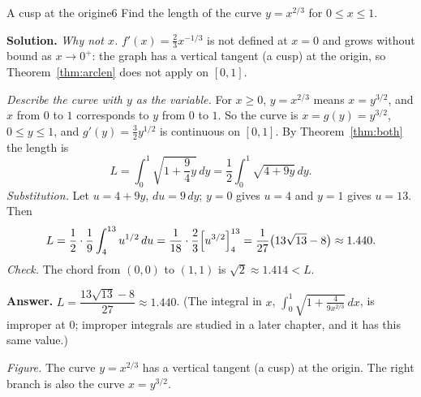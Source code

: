 \documentclass[11pt]{article}
\begin{document}
\begin{exmp}{A cusp at the origin}{e6}
Find the length of the curve $y=x^{2/3}$ for $0\le x\le1$.

\textbf{Solution.} \emph{Why not $x$.} $f'(x)=\frac23x^{-1/3}$ is not defined at $x=0$ and grows without bound as $x\to0^+$: the graph has a vertical tangent (a cusp) at the origin, so Theorem~\ref{thm:arclen} does not apply on $[0,1]$.

\emph{Describe the curve with $y$ as the variable.} For $x\ge0$, $y=x^{2/3}$ means $x=y^{3/2}$, and $x$ from $0$ to $1$ corresponds to $y$ from $0$ to $1$. So the curve is $x=g(y)=y^{3/2}$, $0\le y\le1$, and $g'(y)=\frac32y^{1/2}$ is continuous on $[0,1]$. By Theorem~\ref{thm:both} the length is
\[
L=\int_0^1\sqrt{1+\frac94y}\,dy=\frac12\int_0^1\sqrt{4+9y}\,dy .
\]
\emph{Substitution.} Let $u=4+9y$, $du=9\,dy$; $y=0$ gives $u=4$ and $y=1$ gives $u=13$. Then
\[
L=\frac12\cdot\frac19\int_4^{13}u^{1/2}\,du=\frac1{18}\cdot\frac23\Bigl[u^{3/2}\Bigr]_4^{13}=\frac1{27}\bigl(13\sqrt{13}-8\bigr)\approx1.440 .
\]
\emph{Check.} The chord from $(0,0)$ to $(1,1)$ is $\sqrt2\approx1.414<L$.

\textbf{Answer.} $L=\dfrac{13\sqrt{13}-8}{27}\approx1.440$. (The integral in $x$, $\int_0^1\sqrt{1+\frac4{9x^{2/3}}}\,dx$, is improper at $0$; improper integrals are studied in a later chapter, and it has this same value.)
\begin{center}
\par\small\emph{Figure.} The curve $y=x^{2/3}$ has a vertical tangent (a cusp) at the origin. The right branch is also the curve $x=y^{3/2}$.
\end{center}
\end{exmp}
\end{document}

